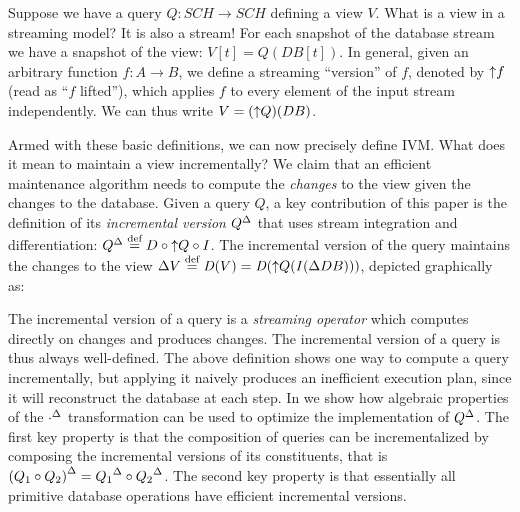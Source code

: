 Suppose we have a query $Q : SCH \to SCH$ defining a view $V$.  What is
a view in a streaming model?  It is also a stream!  For each snapshot
of the database stream we have a snapshot of the view: $V[t] = Q(DB[t])$.
In general, given an arbitrary function $f: A \to B$, we define 
a streaming ``version'' of $f$, denoted by ${\uparrow}f$ 
(read as ``$f$ lifted''), which applies
$f$ to every element of the input stream independently.  
We can thus write $V = ({\uparrow}Q)(DB)$.

Armed with these basic definitions, we can now precisely define IVM.  
What does it mean to maintain a view incrementally?  We claim that an
efficient maintenance algorithm needs to compute the \emph{changes} to 
the view given the changes to the database. Given a query $Q$, a key contribution of this paper is the definition of its \emph{incremental version} ${Q}^{\Delta}$ that uses stream integration and differentiation: ${Q}^{\Delta} \stackrel{\textrm{\scriptsize def}}{=} D \circ {\uparrow}Q \circ I$. The incremental version of the query maintains the changes to the view
$\Delta V \defn \D(V) = %
\D(\lift{Q}(\I(\Delta DB)))$, depicted graphically as:

\begin{center}
\end{center}

The incremental version 
of a query is a \emph{streaming operator} which computes directly on changes
and produces changes.  The incremental version of a query is thus always
well-defined.  The above definition shows one way to compute a query
incrementally, but applying it naively produces an inefficient
execution plan, since it will reconstruct the database at each step.  In 
we show how algebraic properties of the ${\cdot}^{\Delta}$ transformation can be used to
optimize the implementation of ${Q}^{\Delta}$. The first key property is that the
composition of queries can be incrementalized by composing the incremental
versions of its constituents, that is
${(Q_1 \circ Q_2)}^{\Delta} = {Q_1}^{\Delta} \circ {Q_2}^{\Delta}$.  The second key
property is that essentially all primitive database operations
have efficient incremental versions.

